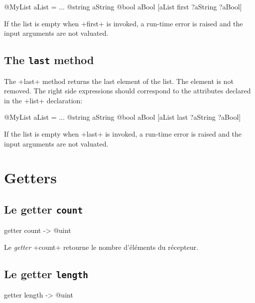 \begin{galgas3}
@MyList aList = ...
@string aString
@bool aBool
[aList first ?aString ?aBool]
\end{galgas3}

If the list is empty when \ggst+first+ is invoked, a run-time error is raised and the input arguments are not valuated.

\subsection{The \texttt{last} method}

The \ggst+last+ method returns the last element of the list. The element is not removed. The right side expressions should correspond to the attributes declared in the \ggst+list+ declaration:\\

\begin{galgas3}
@MyList aList = ...
@string aString
@bool aBool
[aList last ?aString ?aBool]
\end{galgas3}


If the list is empty when \ggst+last+ is invoked, a run-time error is raised and the input arguments are not valuated.








\section{Getters}

\subsection{Le getter \texttt{count}}

\begin{galgas3}
getter count -> @uint
\end{galgas3}

Le \emph{getter} \ggst+count+ retourne le nombre d'éléments du récepteur.



\subsection{Le getter \texttt{length}}

\begin{galgas3}
getter length -> @uint
\end{galgas3}

